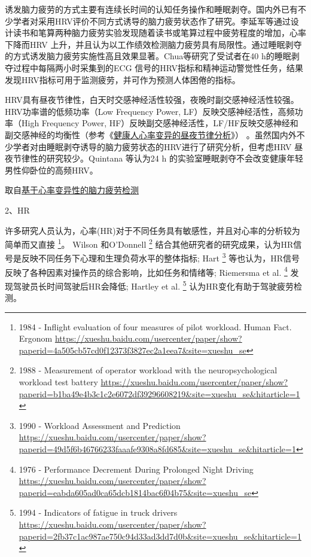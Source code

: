 诱发脑力疲劳的方式主要有连续长时间的认知任务操作和睡眠剥夺。国内外已有不少学者对采用HRV评价不同方式诱导的脑力疲劳状态作了研究。李延军等通过设计读书和笔算两种脑力疲劳实验发现随着读书或笔算过程中疲劳程度的增加，心率下降而HRV 上升，并且认为以工作绩效检测脑力疲劳具有局限性。通过睡眠剥夺的方式诱发脑力疲劳实施性高且效果显著。Chua等研究了受试者在40 h的睡眠剥夺过程中每隔两小时采集到的ECG 信号的HRV指标和精神运动警觉性任务，结果发现HRV指标可用于监测疲劳，并可作为预测人体困倦的指标。

HRV具有昼夜节律性，白天时交感神经活性较强，夜晚时副交感神经活性较强。HRV功率谱的低频功率（Low Frequency Power, LF）反映交感神经活性，高频功率（High Frequency Power, HF）反映副交感神经活性，LF/HF反映交感神经和副交感神经的均衡性（参考《\href{https://kns.cnki.net/kcms/detail/detail.aspx?dbcode=CJFD&dbname=CJFD2000&filename=ZJCY200002034&v=6qyW5%25mmd2Fqipk1z5EsYGOVGp3krgokDUYjpqpntc63glD9%25mmd2BqO5mYMAsQkXAR8sIv6tB}{健康人心率变异的昼夜节律分析}》） 。虽然国内外不少学者对由睡眠剥夺诱导的脑力疲劳状态的HRV进行了研究分析，但考虑HRV 昼夜节律性的研究较少。Quintana 等认为24 h 的实验室睡眠剥夺不会改变健康年轻男性仰卧位的高频HRV。

取自\href{https://xueshu.baidu.com/usercenter/paper/show?paperid=b0ea6808d2959e6a495e1ca285ed72d5&site=xueshu_se&hitarticle=1}{基于心率变异性的脑力疲劳检测}


2、HR

许多研究人员认为，心率(HR)对于不同任务具有敏感性，并且对心率的分析较为简单而又直接
\footnote{1984 - Inflight evaluation of four measures of pilot workload. Human Fact. Ergonom \quad \url{https://xueshu.baidu.com/usercenter/paper/show?paperid=4a505cb57cd0f12373f3827ec2a1eea7&site=xueshu_se}}。
Wilson 和O'Donnell
\footnote{1988 - Measurement of operator workload with the neuropsychological workload test battery \quad \url{https://xueshu.baidu.com/usercenter/paper/show?paperid=b1ba49e4b3c1c2e6072df39296608219&site=xueshu_se&hitarticle=1}} 结合其他研究者的研究成果，认为HR信号是反映不同任务下心理和生理负荷水平的整体指标;
Hart
\footnote{1990 - Workload Assessment and Prediction \quad \url{https://xueshu.baidu.com/usercenter/paper/show?paperid=49d5f6b46766233faaafe9308a8fd685&site=xueshu_se&hitarticle=1}} 等也认为，HR信号反映了各种因素对操作员的综合影响，比如任务和情绪等; Riemersma et al.
\footnote{1976 - Performance Decrement During Prolonged Night Driving \quad \url{https://xueshu.baidu.com/usercenter/paper/show?paperid=eabda605ad0ca65dcb1814bac6f04b75&site=xueshu_se}} 发现驾驶员长时间驾驶后HR会降低;
Hartley et al.
\footnote{1994 - Indicators of fatigue in truck drivers \quad \url{https://xueshu.baidu.com/usercenter/paper/show?paperid=2fb37c1ac987ae750c94d33ad3dd7d0b&site=xueshu_se&hitarticle=1}} 认为HR变化有助于驾驶疲劳检测。

